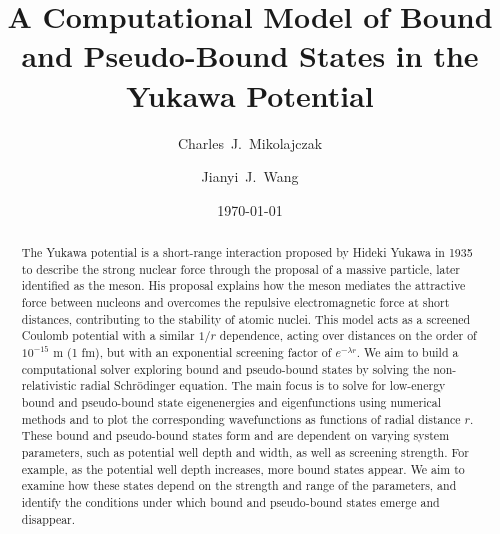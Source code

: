 \documentclass[%
 reprint,
nofootinbib,
 amsmath,amssymb,
 aps,
floatfix,
]{revtex4-2}
\begin{document}

\title{A Computational Model of Bound and Pseudo-Bound States in the Yukawa Potential}

\author{Charles~J.~Mikolajczak}

\author{Jianyi~J.~Wang}%

\date{\today}

\begin{abstract}
{
  The Yukawa potential is a short-range interaction proposed by Hideki Yukawa in 1935 to describe the strong nuclear force through the proposal of a massive particle, later identified as the meson. 
  His proposal explains how the meson mediates the attractive force between nucleons and overcomes the repulsive electromagnetic force at short distances, contributing to the stability of atomic nuclei. 
  This model acts as a screened Coulomb potential with a similar $1/r$ dependence, acting over distances on the order of $10^{-15}$ m (1 fm), but with an exponential screening factor of $e^{-\lambda r}$. 
  We aim to build a computational solver exploring bound and pseudo-bound states by solving the non-relativistic radial Schr\"odinger equation. 
  The main focus is to solve for low-energy bound and pseudo-bound state eigenenergies and eigenfunctions using numerical methods and to plot the corresponding wavefunctions as functions of radial distance $r$. 
  These bound and pseudo-bound states form and are dependent on varying system parameters, such as potential well depth and width, as well as screening strength. 
  For example, as the potential well depth increases, more bound states appear. 
  We aim to examine how these states depend on the strength and range of the parameters, and identify the conditions under which bound and pseudo-bound states emerge and disappear.
}
\end{abstract}
\end{document}
